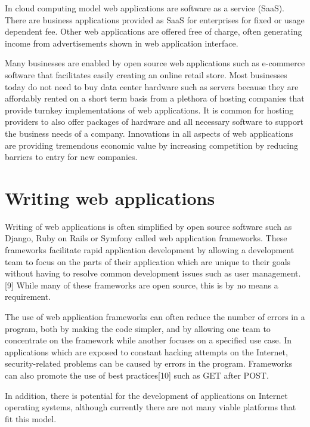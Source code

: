 In cloud computing model web applications are software as a service (SaaS). There are business applications provided as SaaS for enterprises for fixed or usage dependent fee. Other web applications are offered free of charge, often generating income from advertisements shown in web application interface.

Many businesses are enabled by open source web applications such as e-commerce software that facilitates easily creating an online retail store. Most businesses today do not need to buy data center hardware such as servers because they are affordably rented on a short term basis from a plethora of hosting companies that provide turnkey implementations of web applications. It is common for hosting providers to also offer packages of hardware and all necessary software to support the business needs of a company. Innovations in all aspects of web applications are providing tremendous economic value by increasing competition by reducing barriers to entry for new companies.





\section{Writing web applications}


Writing of web applications is often simplified by open source software such as Django, Ruby on Rails or Symfony called web application frameworks. These frameworks facilitate rapid application development by allowing a development team to focus on the parts of their application which are unique to their goals without having to resolve common development issues such as user management.[9] While many of these frameworks are open source, this is by no means a requirement.

The use of web application frameworks can often reduce the number of errors in a program, both by making the code simpler, and by allowing one team to concentrate on the framework while another focuses on a specified use case. In applications which are exposed to constant hacking attempts on the Internet, security-related problems can be caused by errors in the program. Frameworks can also promote the use of best practices[10] such as GET after POST.

In addition, there is potential for the development of applications on Internet operating systems, although currently there are not many viable platforms that fit this model.




